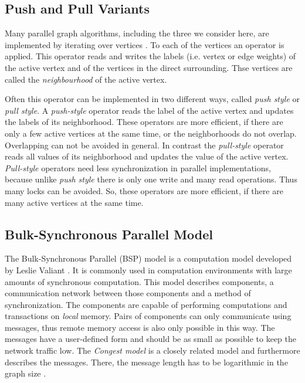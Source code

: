 \subsection{Push and Pull Variants}
Many parallel graph algorithms, including the three we consider here, are implemented by iterating over vertices \cite{tao}.
To each of the vertices an operator is applied.
This operator reads and writes the labels (i.e. vertex or edge weights) of the active vertex and of the vertices in the direct surrounding. Thse vertices are called the \emph{neighbourhood} of the active vertex.

Often this operator can be implemented in two different ways, called \emph{push style} or \emph{pull style}.
A \emph{push-style} operator reads the label of the active vertex and updates the labels of its neighborhood.
These operators are more efficient, if there are only a few active vertices at the same time, or the neighborhoods do not overlap. Overlapping can not be avoided in general.
In contrast the \emph{pull-style} operator reads all values of its neighborhood and updates the value of the active vertex.
\emph{Pull-style} operators need less synchronization in parallel implementations, because unlike \emph{push style} there is only one write and many read operations.
Thus many locks can be avoided.
So, these operators are more efficient, if there are many active vertices at the same time.

\subsection{Bulk-Synchronous Parallel Model}
\label{sec:bsp}
The Bulk-Synchronous Parallel (BSP) model is a computation model developed by Leslie Valiant \cite{bsp}. It is commonly used in computation environments with large amounts of synchronous computation.
This model describes components, a communication network between those components and a method of synchronization.
The components are capable of performing computations and transactions on \emph{local} memory. Pairs of components can only communicate using messages, thus remote memory access is also only possible in this way.
The messages have a user-defined form and should be as small as possible to keep the network traffic low. The \emph{Congest model} is a closely related model and furthermore describes the messages. There, the message length has to be logarithmic in the graph size \cite{congestModel}.

